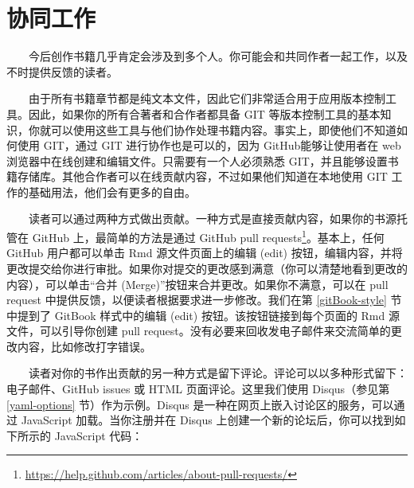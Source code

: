 \documentclass[
  12pt,
]{krantz}
\renewcommand{\href}[2]{#2\footnote{\url{#1}}}
\theoremstyle{definition}
\theoremstyle{definition}
\theoremstyle{definition}
\theoremstyle{definition}
\theoremstyle{remark}
\begin{document}
\hypertarget{ux534fux540cux5de5ux4f5c}{%
\section{协同工作}\label{ux534fux540cux5de5ux4f5c}}

  今后创作书籍几乎肯定会涉及到多个人。你可能会和共同作者一起工作，以及不时提供反馈的读者。

  由于所有书籍章节都是纯文本文件，因此它们非常适合用于应用版本控制工具。因此，如果你的所有合著者和合作者都具备 GIT 等版本控制工具的基本知识，你就可以使用这些工具与他们协作处理书籍内容。事实上，即使他们不知道如何使用 GIT，通过 GIT 进行协作也是可以的，因为 GitHub能够让使用者在 web 浏览器中在线创建和编辑文件。只需要有一个人必须熟悉 GIT，并且能够设置书籍存储库。其他合作者可以在线贡献内容，不过如果他们知道在本地使用 GIT 工作的基础用法，他们会有更多的自由。

  读者可以通过两种方式做出贡献。一种方式是直接贡献内容，如果你的书源托管在 GitHub 上，最简单的方法是通过 \href{https://help.github.com/articles/about-pull-requests/}{GitHub pull requests}。基本上，任何 GitHub 用户都可以单击 Rmd 源文件页面上的编辑 (edit) 按钮，编辑内容，并将更改提交给你进行审批。如果你对提交的更改感到满意（你可以清楚地看到更改的内容），可以单击``合并 (Merge)''按钮来合并更改。如果你不满意，可以在 pull request 中提供反馈，以便读者根据要求进一步修改。我们在第 \ref{gitBook-style} 节中提到了 GitBook 样式中的编辑 (edit) 按钮。该按钮链接到每个页面的 Rmd 源文件，可以引导你创建 pull request。没有必要来回收发电子邮件来交流简单的更改内容，比如修改打字错误。

  读者对你的书作出贡献的另一种方式是留下评论。评论可以以多种形式留下：电子邮件、GitHub issues 或 HTML 页面评论。这里我们使用 Disqus（参见第 \ref{yaml-options} 节）作为示例。Disqus 是一种在网页上嵌入讨论区的服务，可以通过 JavaScript 加载。当你注册并在 Disqus 上创建一个新的论坛后，你可以找到如下所示的 JavaScript 代码：
\end{document}
